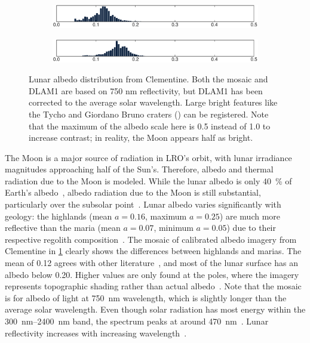 \begin{figure}[t]
    \begin{subfigure}[c]{0.49\textwidth}
        \includegraphics[width=\textwidth]{figures/plots/lunar_hist_photo.pdf}
        \label{fig:lunar-albedo-map-photo}
    \end{subfigure}
   \hfill
    \begin{subfigure}[c]{0.49\textwidth}
        \includegraphics[width=\textwidth]{figures/plots/lunar_hist_dlam1.pdf}
        \label{fig:lunar-albedo-map-dlam1}
    \end{subfigure}

   \caption{Lunar albedo distribution from Clementine. Both the mosaic and \acrshort{DLAM1} are based on 750 nm reflectivity, but \acrshort{DLAM1} has been corrected to the average solar wavelength. Large bright features like the Tycho and Giordano Bruno craters (\textcolor{mpl-pink}{}) can be registered. Note that the maximum of the albedo scale here is 0.5 instead of 1.0 to increase contrast; in reality, the Moon appears half as bright.}
   \label{fig:lunar-albedo-map}
\end{figure}

The Moon is a major source of radiation in \gls{LRO}'s orbit, with lunar irradiance magnitudes approaching half of the Sun's. Therefore, albedo and thermal radiation due to the Moon is modeled. While the lunar albedo is only \qty{40}{\percent} of Earth's albedo~\cite{Goode2001}, albedo radiation due to the Moon is still substantial, particularly over the subsolar point~\cite{Floberghagen1999}. Lunar albedo varies significantly with geology: the highlands (mean $a = 0.16$, maximum $a=0.25$) are much more reflective than the maria (mean $a = 0.07$, minimum $a = 0.05$) due to their respective regolith composition~\cite{Vasavada2012,Hayne2017,Sato2014}. The mosaic of calibrated albedo imagery from Clementine in \cref{fig:lunar-albedo-map-photo} clearly shows the differences between highlands and marias. The mean of 0.12 agrees with other literature~\cite{Vasavada2012}, and most of the lunar surface has an albedo below 0.20. Higher values are only found at the poles, where the imagery represents topographic shading rather than actual albedo~\cite{McEwen1997}. Note that the mosaic is for albedo of light at \qty{750}{\nm} wavelength, which is slightly longer than the average solar wavelength. Even though solar radiation has most energy within the \qtyrange{300}{2400}{\nm} band, the spectrum peaks at around \qty{470}{\nm}~\cite{Iqbal1983}. Lunar reflectivity increases with increasing wavelength~\cite{Shkuratov2011}.

